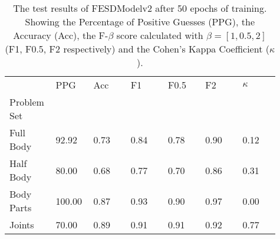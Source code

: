     \begin{table}[!htbp]
        \caption[Test Results of FESDModelv2]{The test results of FESDModelv2 after 50 epochs of training. Showing the Percentage of Positive Guesses (PPG), the Accuracy (Acc), the F-$\beta$ score calculated with $\beta = [1, 0.5, 2]$ (F1, F0.5, F2 respectively) and the Cohen's Kappa Coefficient ($\kappa$).}
        \label{tab:res_v2}
        \begin{tabular}{p{0.13\linewidth}p{0.13\linewidth}p{0.13\linewidth}p{0.13\linewidth}p{0.13\linewidth}p{0.13\linewidth}p{0.13\linewidth}}
\hline
{} &    PPG &  Acc &   F1 &  F0.5 &   F2 &  $\kappa$ \\
Problem Set   &        &      &      &       &      &           \\
\hline
Full Body  &  92.92 & 0.73 & 0.84 &  0.78 & 0.90 &      0.12 \\
Half Body  &  80.00 & 0.68 & 0.77 &  0.70 & 0.86 &      0.31 \\
Body Parts & 100.00 & 0.87 & 0.93 &  0.90 & 0.97 &      0.00 \\
Joints     &  70.00 & 0.89 & 0.91 &  0.91 & 0.92 &      0.77 \\
\hline
\end{tabular}

    \end{table}
  